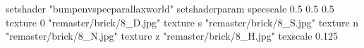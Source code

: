 setshader "bumpenvspecparallaxworld"
setshaderparam specscale 0.5 0.5 0.5
    texture 0 "remaster/brick/8_D.jpg"
    texture s "remaster/brick/8_S.jpg"
    texture n "remaster/brick/8_N.jpg"
    texture z "remaster/brick/8_H.jpg"
    texscale 0.125